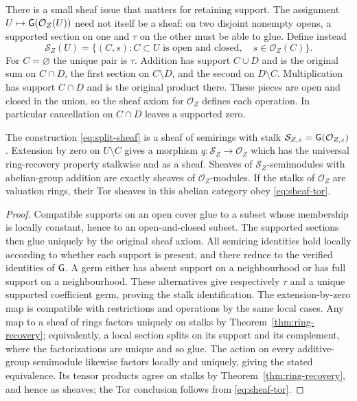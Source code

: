 There is a small sheaf issue that matters for retaining support.
The assignment $U\mapsto\mathsf G(\mathcal O_Z(U))$ need not itself be a sheaf:
on two disjoint nonempty opens, a supported section on one and $\tau$ on
the other must be able to glue. Define instead
\[
 \mathcal S_Z(U)=\{(C,s):C\subset U\text{ is open and closed},\quad
                         s\in\mathcal O_Z(C)\}.
 \tag{AV6.3}\label{eq:split-sheaf}
\]
For $C=\varnothing$ the unique pair is $\tau$. Addition has support
$C\cup D$ and is the original sum on $C\cap D$, the first section on
$C\setminus D$, and the second on $D\setminus C$. Multiplication has
support $C\cap D$ and is the original product there. These pieces are
open and closed in the union, so the sheaf axiom for $\mathcal O_Z$
defines each operation. In particular cancellation on $C\cap D$ leaves
a supported zero.

\begin{proposition}
\label{prop:sheafsplit}
The construction \eqref{eq:split-sheaf} is a sheaf of semirings with
stalk $\mathcal S_{Z,z}=\mathsf G(\mathcal O_{Z,z})$. Extension by zero on
$U\setminus C$ gives a morphism $q:\mathcal S_Z\to\mathcal O_Z$ which
has the universal ring-recovery property stalkwise and as a sheaf.
Sheaves of $\mathcal S_Z$-semimodules with abelian-group addition are
exactly sheaves of $\mathcal O_Z$-modules. If the stalks of
$\mathcal O_Z$ are valuation rings, their Tor sheaves in this abelian
category obey \eqref{eq:sheaf-tor}.
\end{proposition}
\begin{proof}
Compatible supports on an open cover glue to a subset whose membership
is locally constant, hence to an open-and-closed subset. The supported
sections then glue uniquely by the original sheaf axiom. All semiring
identities hold locally according to whether each support is present,
and there reduce to the verified identities of $\mathsf G$.
A germ either has absent support on a neighbourhood or has full support
on a neighbourhood. These alternatives give respectively $\tau$ and
a unique supported coefficient germ, proving the stalk identification.
The extension-by-zero map is compatible with restrictions and
operations by the same local cases. Any map to a sheaf of rings factors
uniquely on stalks by Theorem~\ref{thm:ring-recovery}; equivalently, a
local section splits on its support and its complement, where the
factorizations are unique and so glue. The action on every additive-group
semimodule likewise factors locally and uniquely, giving the stated
equivalence. Its tensor products agree on stalks by
Theorem~\ref{thm:ring-recovery}, and hence as sheaves; the Tor conclusion
follows from \eqref{eq:sheaf-tor}.
\end{proof}

